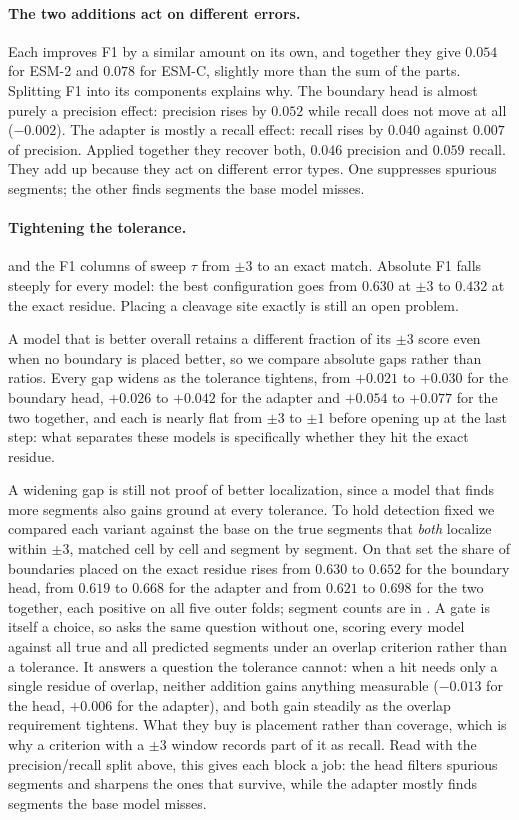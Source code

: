 \documentclass{article}
\begin{document}
\paragraph{The two additions act on different errors.} Each improves F1 by a similar amount on its own, and together they give $0.054$ for ESM-2 and $0.078$ for ESM-C, slightly more than the sum of the parts. Splitting F1 into its components explains why. The boundary head is almost purely a precision effect: precision rises by $0.052$ while recall does not move at all ($-0.002$). The adapter is mostly a recall effect: recall rises by $0.040$ against $0.007$ of precision. Applied together they recover both, $0.046$ precision and $0.059$ recall. They add up because they act on different error types. One suppresses spurious segments; the other finds segments the base model misses.

\paragraph{Tightening the tolerance.}  and the F1 columns of  sweep $\tau$ from $\pm3$ to an exact match. Absolute F1 falls steeply for every model: the best configuration goes from $0.630$ at $\pm3$ to $0.432$ at the exact residue. Placing a cleavage site exactly is still an open problem.

A model that is better overall retains a different fraction of its $\pm3$ score even when no boundary is placed better, so we compare absolute gaps rather than ratios. Every gap widens as the tolerance tightens, from $+0.021$ to $+0.030$ for the boundary head, $+0.026$ to $+0.042$ for the adapter and $+0.054$ to $+0.077$ for the two together, and each is nearly flat from $\pm3$ to $\pm1$ before opening up at the last step: what separates these models is specifically whether they hit the exact residue.

A widening gap is still not proof of better localization, since a model that finds more segments also gains ground at every tolerance. To hold detection fixed we compared each variant against the base on the true segments that \emph{both} localize within $\pm3$, matched cell by cell and segment by segment. On that set the share of boundaries placed on the exact residue rises from $0.630$ to $0.652$ for the boundary head, from $0.619$ to $0.668$ for the adapter and from $0.621$ to $0.698$ for the two together, each positive on all five outer folds; segment counts are in . A gate is itself a choice, so  asks the same question without one, scoring every model against all true and all predicted segments under an overlap criterion rather than a tolerance. It answers a question the tolerance cannot: when a hit needs only a single residue of overlap, neither addition gains anything measurable ($-0.013$ for the head, $+0.006$ for the adapter), and both gain steadily as the overlap requirement tightens. What they buy is placement rather than coverage, which is why a criterion with a $\pm3$ window records part of it as recall. Read with the precision/recall split above, this gives each block a job: the head filters spurious segments and sharpens the ones that survive, while the adapter mostly finds segments the base model misses.
\end{document}
